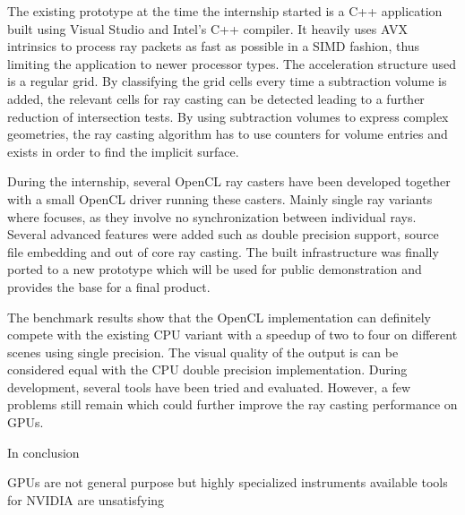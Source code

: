 The existing prototype at the time the internship started is a C++ application built using Visual Studio and Intel's C++ compiler. It heavily uses AVX intrinsics to process ray packets as fast as possible in a SIMD fashion, thus limiting the application to newer processor types. The acceleration structure used is a regular grid. By classifying the grid cells every time a subtraction volume is added, the relevant cells for ray casting can be detected leading to a further reduction of intersection tests. By using subtraction volumes to express complex geometries, the ray casting algorithm has to use counters for volume entries and exists in order to find the implicit surface.

During the internship, several OpenCL ray casters have been developed together with a small OpenCL driver running these casters. Mainly single ray variants where focuses, as they involve no synchronization between individual rays. Several advanced features were added such as double precision support, source file embedding and out of core ray casting. The built infrastructure was finally ported to a new prototype which will be used for public demonstration and provides the base for a final product.

The benchmark results show that the OpenCL implementation can definitely compete with the existing CPU variant with a speedup of two to four on different scenes using single precision. The visual quality of the output is can be considered equal with the CPU double precision implementation. During development, several tools have been tried and evaluated. However, a few problems still remain which could further improve the ray casting performance on GPUs.

In conclusion 

GPUs are not general purpose but highly specialized instruments
available tools for NVIDIA are unsatisfying

